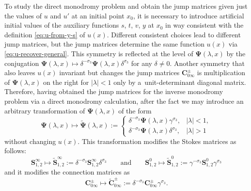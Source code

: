 To study the direct monodromy problem and obtain the jump matrices given just the values of $u$ and $u'$ at an initial point $x_0$, it is necessary to introduce artificial initial values of the auxiliary functions $s$, $t$, $v$, $y$ at $x_0$ in way consistent with the definition \eqref{eq:u-from-y-s} of $u(x)$. Different consistent choices lead to different jump matrices, but the jump matrices determine the same function $u(x)$ via \eqref{eq:u-recover-general}. This symmetry is reflected at the level of $\mathbf{\Psi}(\lambda,x)$ by the conjugation
 $\mathbf{\Psi}(\lambda,x)\mapsto \delta^{-\sigma_3}\mathbf{\Psi}(\lambda,x)\delta^{\sigma_3}$
 for any $\delta\neq 0$. Another symmetry that also leaves $u(x)$ invariant but changes the jump matrices $\mathbf{C}_{0\infty}^\pm$ is multiplication of $\mathbf{\Psi}(\lambda,x)$ on the right for $|\lambda|<1$ only by a~unit-determinant diagonal matrix. Therefore, having obtained the jump matrices for the inverse monodromy problem via a direct monodromy calculation, after the fact we may introduce an arbitrary transformation of $\mathbf{\Psi}(\lambda,x)$ of the form
\begin{equation}\label{eq:transf}
 \boldsymbol \Psi(\lambda,x)\mapsto \widetilde{\mathbf{\Psi}}(\lambda,x):=\begin{cases}
 \delta^{-\sigma_3} \boldsymbol \Psi(\lambda,x)\gamma^{\sigma_3},&|\lambda|<1,\\
 \delta^{-\sigma_3}\boldsymbol \Psi(\lambda,x)\delta^{\sigma_3},&|\lambda|>1
 \end{cases}
\end{equation}
without changing $u(x)$. This transformation modifies the Stokes matrices as follows:
 \begin{equation}\label{eq:stokes-transformation}
 \mathbf{S}^\infty_{1,2}\mapsto \widetilde{\mathbf{S}}^\infty_{1,2}:=\delta^{-\sigma_3}\mathbf{S}^\infty_{1,2}\delta^{\sigma_3}\qquad\text{and}\qquad
 \mathbf{S}^0_{1,2}\mapsto \widetilde{\mathbf{S}}^0_{1,2}:=\gamma^{-\sigma_3}\mathbf{S}^0_{1,2}\gamma^{\sigma_3}
 \end{equation}
 and it modifies the connection matrices as
 \begin{equation}
 \mathbf{C}_{0\infty}^\pm\mapsto\widetilde{\mathbf{C}}_{0\infty}^\pm:=\delta^{-\sigma_3}\mathbf{C}_{0\infty}^\pm\gamma^{\sigma_3}.
 \label{eq:connection-modify}
 \end{equation}

